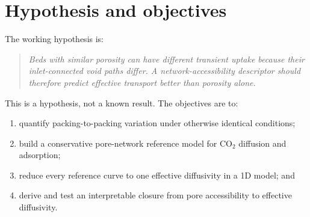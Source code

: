 \documentclass[10pt,a4paper]{article}
\begin{document}
\newpage
\section{Hypothesis and objectives}
The working hypothesis is:
\begin{quote}\itshape
Beds with similar porosity can have different transient uptake because their
inlet-connected void paths differ. A network-accessibility descriptor should
therefore predict effective transport better than porosity alone.
\end{quote}
This is a hypothesis, not a known result. The objectives are to:
\begin{enumerate}
\item quantify packing-to-packing variation under otherwise identical conditions;
\item build a conservative pore-network reference model for CO$_2$ diffusion and adsorption;
\item reduce every reference curve to one effective diffusivity in a 1D model; and
\item derive and test an interpretable closure from pore accessibility to effective diffusivity.
\end{enumerate}
\end{document}
